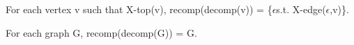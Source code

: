 \documentclass[acmsmall,dvipsnames,10pt,review,anonymous]{acmart}\settopmatter{printfolios=true}
\newcommand{\edgevar}[0]{\ensuremath{\epsilon}}
\newcommand{\set}[1]{\{#1\}}
\begin{document}
\begin{lemma}
\label{lem:redecomp-top}
    For each vertex v such that X-top(v), recomp(decomp(v)) = \set{\edgevar s.t. X-edge(\edgevar,v)}.
\end{lemma}

\begin{theorem}
\label{thm:redecomp}
    For each graph G, recomp(decomp(G)) = G. 
\end{theorem}
\end{document}
